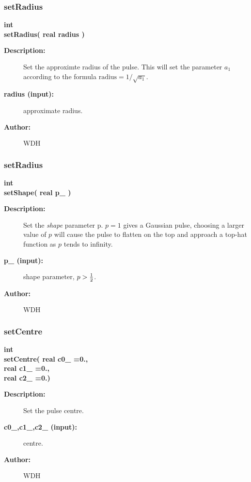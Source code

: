 \subsubsection{setRadius}
 
\begin{flushleft} \textbf{%
int  \\ 
\settowidth{\OGPulseFunctionIncludeArgIndent}{setRadius(}%
setRadius( real radius )
}\end{flushleft}
\begin{description}
\item[{\bf Description:}] 
  Set the approximte radius of the pulse. This will set the parameter $a_1$
   according to the formula $\mbox{radius} = 1/\sqrt{a_1}$.
  
\item[{\bf radius (input):}]  approximate radius.
 
\item[{\bf Author:}]  WDH
\end{description}
\subsubsection{setRadius}
 
\begin{flushleft} \textbf{%
int  \\ 
\settowidth{\OGPulseFunctionIncludeArgIndent}{setShape(}%
setShape( real p\_ )
}\end{flushleft}
\begin{description}
\item[{\bf Description:}] 
  Set the {\it shape} parameter p. $p=1$ gives a Gaussian pulse, choosing a larger value of $p$
  will cause the pulse to flatten on the top and approach a top-hat function as $p$ tends to infinity.
  
\item[{\bf p\_ (input):}]  shape parameter, $p>{1\over2}$.
 
\item[{\bf Author:}]  WDH
\end{description}
\subsubsection{setCentre}
 
\begin{flushleft} \textbf{%
int  \\ 
\settowidth{\OGPulseFunctionIncludeArgIndent}{setCentre(}%
setCentre( real c0\_   =0.,\\ 
\hspace{\OGPulseFunctionIncludeArgIndent}real c1\_   =0.,\\ 
\hspace{\OGPulseFunctionIncludeArgIndent}real c2\_   =0.)
}\end{flushleft}
\begin{description}
\item[{\bf Description:}] 
  Set the pulse centre.
  
\item[{\bf c0\_,c1\_,c2\_ (input):}]  centre.
 
\item[{\bf Author:}]  WDH
\end{description}

